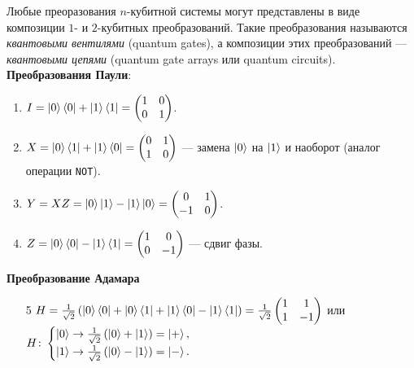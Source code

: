 \documentclass{article}
\theoremstyle{definition}
\begin{document}
Любые преоразования $n$-кубитной системы могут представлены в виде композиции 
$1$- и $2$-кубитных преобразований.
Такие преобразования называются {\em квантовыми вентилями} (quantum gates),
а композиции этих преобразований --- {\em квантовыми цепями} (quantum gate arrays или quantum circuits).
%
\textbf{Преобразования Паули}:
\begin{enumerate}
    \item $I = \ket{0}\bra{0} + \ket{1}\bra{1} = \begin{pmatrix}
        1 & 0 \\
        0 & 1\\
    \end{pmatrix}$.
    \item $X = \ket{0}\bra{1} + \ket{1}\bra{0} = \begin{pmatrix}
        0 & 1 \\
        1 & 0 \\
    \end{pmatrix}$ --- замена $\ket{0}$ на $\ket{1}$ и наоборот (аналог операции \texttt{NOT}).
    \item $Y = XZ = \ket{0}\ket{1} - \ket{1}\ket{0} = \begin{pmatrix}
    0 & 1 \\
    -1 & 0 \\
    \end{pmatrix}$.
    \item $Z = \ket{0}\bra{0} - \ket{1}\bra{1} = \begin{pmatrix}
    1 & 0 \\
    0 & -1 \\
    \end{pmatrix}$ --- сдвиг фазы.
\end{enumerate}
%
\textbf{Преобразование Адамара}
\begin{enumerate}
    \item[5] $H = \frac{1}{\sqrt{2}}\left (
    \ket{0}\bra{0} + \ket{0}\bra{1} + \ket{1}\bra{0} - \ket{1}\bra{1}
    \right ) = \frac{1}{\sqrt{2}}\begin{pmatrix}
        1 & 1 \\
        1 & -1 \\
    \end{pmatrix}$ или \\
    $H \colon \begin{cases}
    \ket{0} \rightarrow \frac{1}{\sqrt{2}} \left (
        \ket{0} + \ket{1}
    \right ) = \ket{+}, \\
    \ket{1} \rightarrow \frac{1}{\sqrt{2}} \left (
        \ket{0} - \ket{1}
    \right ) = \ket{-}.
    \end{cases}$
\end{enumerate}
\end{document}
